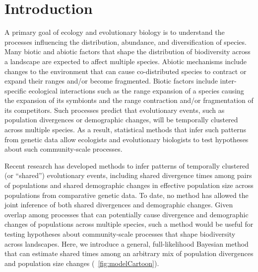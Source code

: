 \section{Introduction}

A primary goal of ecology and evolutionary biology is to understand the
processes influencing the distribution, abundance, and diversification of
species.
Many biotic and abiotic factors that shape the distribution of biodiversity
across a landscape are expected to affect multiple species.
Abiotic mechanisms include changes to the environment that can cause
co-distributed species to contract or expand their ranges and/or become
fragmented.
Biotic factors include inter-specific ecological interactions such as the range
expansion of a species causing the expansion of its symbionts and the range
contraction and/or fragmentation of its competitors.
Such processes predict that evolutionary events, such as population divergences
or demographic changes, will be temporally clustered across multiple species.
As a result, statistical methods that infer such patterns from genetic data
allow ecologists and evolutionary biologists to test hypotheses about such
community-scale processes.

Recent research has developed methods to infer
patterns of temporally clustered (or ``shared'') evolutionary events,
including shared divergence times among pairs of populations
\citep{Hickerson2006,Hickerson2007,Huang2011,Oaks2014dpp,Oaks2018ecoevolity}
and shared demographic changes in effective population size across populations
\citep{Chan2014,Xue2015,Burbrink2016,Xue2017,Gehara2017}
from comparative genetic data.
To date, no method has allowed the joint inference of both shared divergences
and demographic changes.
Given overlap among processes that can potentially cause divergence and
demographic changes of populations across multiple species, such a method would
be useful for testing hypotheses about community-scale processes that shape
biodiversity across landscapes.
Here, we introduce a general, full-likelihood Bayesian method that can estimate
shared times among an arbitrary mix of population divergences and population
size changes (\fig{}~\ref{fig:modelCartoon}).

